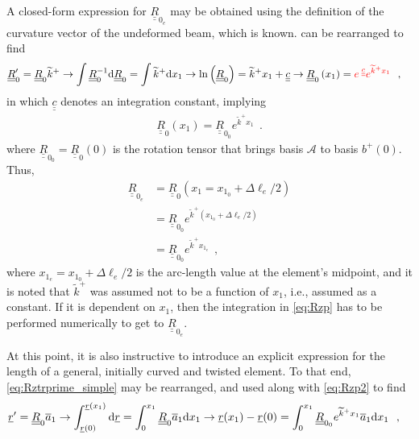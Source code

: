 \documentclass[12pt,a4paper,oneside,english]{abntex2} %
\newcommand{\fix}[1]{{\color{red}#1}}
\newcommand{\vect}[1]{\underline{#1}}
\newcommand{\uvec}[1]{\overline{#1}}
\def\tens#1{\underline{\underline{#1}}}
\def\til#1{\widetilde{#1}}
\def\lp{\left(}
\def\rp{\right)}
\def\A{\mathcal{A}}
\def\bp{b^+}
\def\xo{x_1}
\def\aone{\uvec{a}_1}
\def\R{\tens{R}}
\def\Rz{\R_0}
\def\Rzp{\R^{\prime}_0}
\def\Rzz{\R_{0_0}}
\def\r{\vect{r}}
\def\rprime{\r^{\prime}}
\def\ktil{\til{k}}
\def\ktilp{\ktil^{+}}
\def\Deltal{\Delta \ell_e}
\def\d{\textnormal{d}}
\def\Rze{\R_{0_e}}
\def\xom{x_{1_e}}
\def\xoz{x_{1_0}}
\begin{document}
\begin{apendicesenv}
A closed-form expression for $\Rze$ may be obtained using the definition of the curvature vector of the undeformed beam, which is known.  can be rearranged to find
\begin{align}
    \Rzp &= \Rz\ktilp \rightarrow \int \Rz^{-1} \d\Rz = \int \ktilp \d \xo \rightarrow \ln\lp\Rz\rp = \ktilp \xo + \tens{c} \rightarrow
    \Rz\lp \xo \rp = \fix{e^{\;\tens{c}} e^{\ktilp\xo}} \ \ ,
    \label{eq:Rzp}
\end{align}
\fix{in which $\tens{c}$ denotes an integration constant, implying}
\begin{align}
    \Rz\lp \xo \rp = \Rzz e^{\ktilp\xo} \ \ .
    \label{eq:Rzp2}
\end{align}
\fix{where $\Rzz = \Rz(0)$ is the rotation tensor that brings basis $\A$ to basis $\bp(0)$.} Thus,
\begin{align}
    \Rze &= \Rz\lp \xo = \xoz + \Deltal/2 \rp \nonumber \\
    &= \Rzz e^{\ktilp\lp\xoz+\Deltal/2\rp} 
    \nonumber \\
    &= \Rzz e^{\ktilp\xom} \ \ ,
    \label{eq:Rze}
\end{align}
where $\xom = \xoz + \Deltal/2$ is the arc-length value at the element's midpoint, and it is noted that $\ktilp$ was assumed not to be a function of $\xo$, i.e., assumed as a constant. If it is dependent on $\xo$, then the integration in \cref{eq:Rzp} has to be performed numerically to get to $\Rze$. 

At this point, it is also instructive to introduce an explicit expression for the length of a general, initially curved and twisted element. To that end, \cref{eq:Rztrprime_simple} may be rearranged, and used along with \cref{eq:Rzp2} to find
\begin{align}
    \rprime &= \Rz\aone \rightarrow \int_{\r(0)}^{\r(\xo)} \d\r = \int_0^{\xo} \Rz\aone \d \xo \rightarrow \r(\xo) - \r(0) = \int_0^{\xo} \Rzz e^{\ktilp\xo}\aone \d\xo \ \ ,
    \label{eq:rprime}
\end{align}


\end{apendicesenv}
\end{document}

